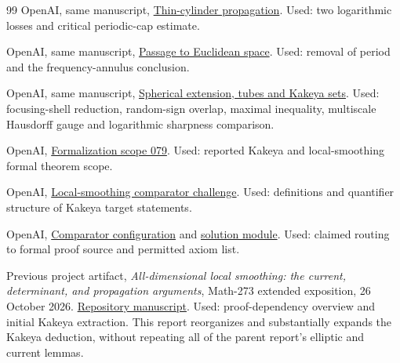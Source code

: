\documentclass[11pt,a4paper]{article}
\numberwithin{equation}{section}
\theoremstyle{definition}
\theoremstyle{remark}
\begin{document}
\begin{thebibliography}{99}
 OpenAI, same manuscript,
\href{https://github.com/openai/math/blob/7ef5c0cc5ca4b0e072b7a050fca09ab24bc6fa3a/preprints/Local-smoothing-for-the-Euclidean-wave-equation-October-25-2026/build/sections/propagation.tex}{Thin-cylinder propagation}. Used: two
logarithmic losses and critical periodic-cap estimate.

 OpenAI, same manuscript,
\href{https://github.com/openai/math/blob/7ef5c0cc5ca4b0e072b7a050fca09ab24bc6fa3a/preprints/Local-smoothing-for-the-Euclidean-wave-equation-October-25-2026/build/sections/transfer.tex}{Passage to Euclidean space}. Used: removal of
period and the frequency-annulus conclusion.

 OpenAI, same manuscript,
\href{https://github.com/openai/math/blob/7ef5c0cc5ca4b0e072b7a050fca09ab24bc6fa3a/preprints/Local-smoothing-for-the-Euclidean-wave-equation-October-25-2026/build/sections/kakeya.tex}{Spherical extension, tubes and Kakeya sets}.
Used: focusing-shell reduction, random-sign overlap, maximal inequality,
multiscale Hausdorff gauge and logarithmic sharpness comparison.

 OpenAI,
\href{https://github.com/openai/math/blob/7ef5c0cc5ca4b0e072b7a050fca09ab24bc6fa3a/lean/docs/079.md}{Formalization scope 079}.
Used: reported Kakeya and local-smoothing formal theorem scope.

 OpenAI,
\href{https://github.com/openai/math/blob/7ef5c0cc5ca4b0e072b7a050fca09ab24bc6fa3a/lean/ComparatorChallenges/LocalSmoothing.lean}{Local-smoothing comparator challenge}.
Used: definitions and quantifier structure of Kakeya target statements.

 OpenAI,
\href{https://github.com/openai/math/blob/7ef5c0cc5ca4b0e072b7a050fca09ab24bc6fa3a/lean/ComparatorChallenges/LocalSmoothing.json}{Comparator
configuration} and
\href{https://github.com/openai/math/blob/7ef5c0cc5ca4b0e072b7a050fca09ab24bc6fa3a/lean/OAI/Analysis/Fourier/LocalSmoothing/Comparator.lean}{solution
module}. Used: claimed routing to formal proof source and permitted axiom list.

 Previous project artifact,
\emph{All-dimensional local smoothing: the current, determinant, and
propagation arguments}, Math-273 extended exposition, 26 October 2026.
\href{https://github.com/mehmetmars7/Erdosproblems-llm-hunter/blob/ef4de17e/attacks/open_problems/top_problems/gpt_6_astra_pro/30004844_v2.tex}{Repository manuscript}. Used: proof-dependency overview and initial Kakeya extraction. This
report reorganizes and substantially expands the Kakeya deduction,
without repeating all of the parent report's elliptic and current lemmas.
\end{thebibliography}
\end{document}
